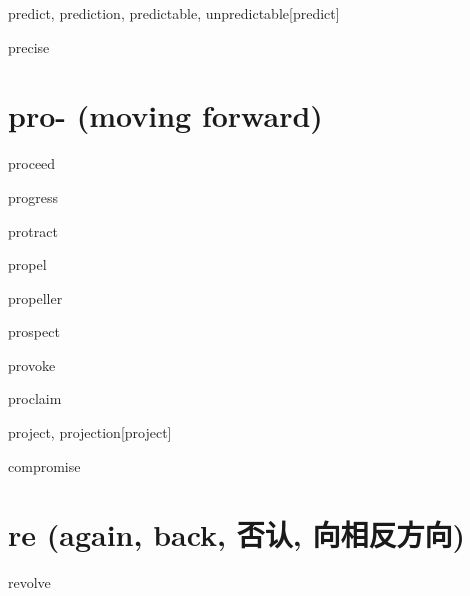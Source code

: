 \begin{RefWord}{predict, prediction, predictable, unpredictable}[predict]
\end{RefWord}

\begin{RefWord}{precise}
\end{RefWord}

\section{pro- (moving forward)}

\begin{RefWord}{proceed}
\end{RefWord}

\begin{RefWord}{progress}
\end{RefWord}

\begin{RefWord}{protract}
\end{RefWord}

\begin{RefWord}{propel}
\end{RefWord}

\begin{RefWord}{propeller}
\end{RefWord}

\begin{RefWord}{prospect}
\end{RefWord}

\begin{RefWord}{provoke}
\end{RefWord}

\begin{RefWord}{proclaim}
\end{RefWord}

\begin{RefWord}{project, projection}[project]
\end{RefWord}

\begin{RefWord}{compromise}
\end{RefWord}

\section{re (again, back, 否认, 向相反方向)}

\begin{RefWord}{revolve}
\end{RefWord}

